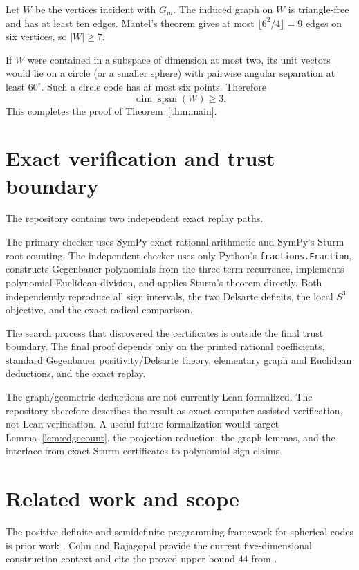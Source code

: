 \documentclass[11pt]{article}
\begin{document}
Let $W$ be the vertices incident with $G_m$. The induced graph on $W$ is
triangle-free and has at least ten edges. Mantel's theorem gives at most
$\lfloor 6^2/4\rfloor=9$ edges on six vertices, so $|W|\ge7$.

If $W$ were contained in a subspace of dimension at most two, its unit
vectors would lie on a circle (or a smaller sphere) with pairwise angular
separation at least $60^\circ$. Such a circle code has at most six points.
Therefore
\[
\dim\operatorname{span}(W)\ge3.
\]
This completes the proof of Theorem~\ref{thm:main}.

\section{Exact verification and trust boundary}

The repository contains two independent exact replay paths.

The primary checker uses SymPy exact rational arithmetic and SymPy's Sturm
root counting. The independent checker uses only Python's
\texttt{fractions.Fraction}, constructs Gegenbauer polynomials from the
three-term recurrence, implements polynomial Euclidean division, and applies
Sturm's theorem directly. Both independently reproduce all sign intervals,
the two Delsarte deficits, the local $S^3$ objective, and the exact radical
comparison.

The search process that discovered the certificates is outside the final
trust boundary. The final proof depends only on the printed rational
coefficients, standard Gegenbauer positivity/Delsarte theory, elementary
graph and Euclidean deductions, and the exact replay.

The graph/geometric deductions are not currently Lean-formalized. The
repository therefore describes the result as exact computer-assisted
verification, not Lean verification. A useful future formalization would
target Lemma~\ref{lem:edgecount}, the projection reduction, the graph lemmas,
and the interface from exact Sturm certificates to polynomial sign claims.

\section{Related work and scope}

The positive-definite and semidefinite-programming framework for spherical
codes is prior work \cite{bachocvallentin2008}. Cohn and Rajagopal
\cite{cohnrajagopal2026} provide the current five-dimensional construction
context and cite the proved upper bound $44$ from
\cite{mittelmannvallentin2010}.
\end{document}
